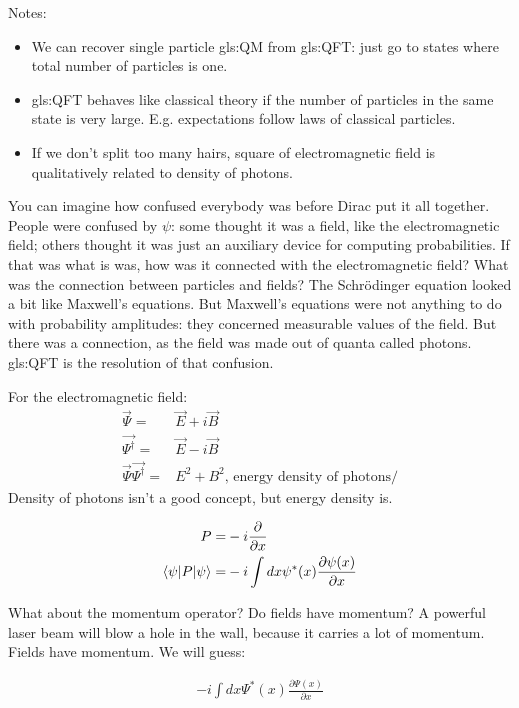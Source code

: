 \documentclass[]{article}
\newcommand{\Schr}{{Schr\"odinger }}
\begin{document}
Notes:
\begin{itemize}
	\item We can recover single particle \gls{gls:QM} from \gls{gls:QFT}: just go to states where total number of particles is one.
	\item \gls{gls:QFT} behaves like classical theory if the number of particles in the same state is very large. E.g. expectations follow  laws of classical particles.
	\item If we don't split too many hairs, square of electromagnetic field is qualitatively related to density of photons.
\end{itemize}


You can imagine how confused everybody was before Dirac put it all together. People were confused by $\psi$: some thought it was a field, like the electromagnetic field; others thought it was just an auxiliary device for computing probabilities. If that was what is was, how was it connected with the electromagnetic field? What was the connection between particles and fields? The \Schr equation looked a bit like Maxwell's equations. But Maxwell's equations were not anything to do with probability amplitudes: they concerned measurable values of the field. But there was a connection, as the field was made out of quanta called photons. \gls{gls:QFT} is the resolution of that confusion.  

For the electromagnetic field:
\begin{align*}
	\vec{\Psi} =& \vec{E} + i \vec{B}\\
	\vec{\Psi^{\dagger}} =& \vec{E} - i \vec{B}\\
	\vec{\Psi} \vec{\Psi^{\dagger}} =& E^2+B^2 \text{, energy density of photons/}
\end{align*}
Density of photons isn't a good concept, but energy density is.

\begin{align*}
	P =& -i \frac{\partial}{\partial x}\\
	\braket{\psi | P| \psi} =& -i \int dx \psi^*(x) \frac{\partial \psi(x)}{\partial x}
\end{align*}

What about the momentum operator? Do fields have momentum? A powerful laser beam will blow a hole in the wall, because it carries a lot of momentum. Fields have momentum. We will guess:

\begin{align*}
	 -i \int dx \Psi^*(x) \frac{\partial \Psi(x)}{\partial x}
\end{align*}
\end{document}
